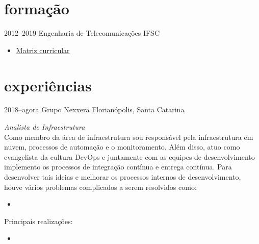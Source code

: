 \documentclass[]{friggeri-cv} %
\begin{document}

\section{formação}

\begin{entrylist}
\entry
{2012--2019}
{Engenharia de Telecomunicações}
{IFSC}
{
    \begin{itemize}
        \item \href{https://wiki.sj.ifsc.edu.br/index.php/Matriz_Curricular_da_Engenharia_de_Telecomunica%C3%A7%C3%B5es}{Matriz curricular}
    \end{itemize}
}
\end{entrylist}


\section{experiências}

\begin{entrylist}
\entry
{2018--agora}
{Grupo Nexxera}
{Florianópolis, Santa Catarina}
{\emph{Analista de Infraestrutura} \\

    Como membro da área de infraestrutura sou responsável pela infraestrutura em nuvem,
    processos de automação e o monitoramento. Além disso, atuo como evangelista da cultura DevOps e juntamente com as equipes de desenvolvimento implemento os processos de integração contínua e entrega contínua. Para desenvolver tais ideias e melhorar os processos internos de desenvolvimento, houve vários problemas complicados a serem resolvidos como:

\begin{itemize}
    \item 
\end{itemize}

Principais realizações:\\

\begin{itemize}
    \item 
\end{itemize}

}
\end{entrylist}
\end{document}
